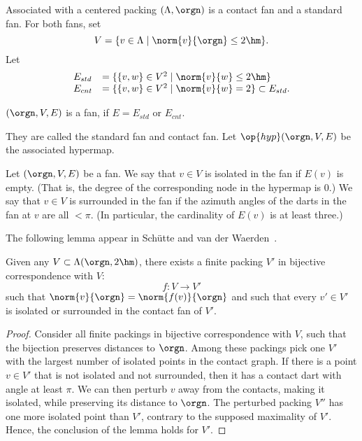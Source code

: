 Associated with a centered packing $(\Lambda,\orgn)$ is a contact fan and a standard fan.  For both fans, set
$$
V = \{v\in \Lambda\mid \norm{v}{\orgn}\le 2\hm\}.
$$
Let
\begin{equation}\label{eqn:fan-edge}
\begin{array}{lll}
 E_{std} &= \{\{v,w\}\in V^2\mid \norm{v}{w}\le 2\hm \}\\
 E_{cnt} &= \{\{v,w\}\in V^2\mid \norm{v}{w}= 2 \}\subset E_{std}.
\end{array}
\end{equation}

\begin{lemma}
$(\orgn,V,E)$ is a fan, if $E=E_{std}$ or $E_{cnt}$.
\end{lemma}
They are called the standard fan and contact fan.
Let $\op{hyp}(\orgn,V,E)$ be the associated hypermap.

\begin{definition}
Let $(\orgn,V,E)$ be a fan.
We say that $v\in V$ is isolated in the fan if $E(v)$ is empty.
(That is, the degree of the corresponding node in the hypermap is $0$.) We say that $v\in V$ is surrounded in the fan if the azimuth angles of the darts in the fan at $v$ are all $<\pi$.  (In particular, the cardinality of $E(v)$ is at least three.)
\end{definition}

The following lemma appear in Sch\"utte and van der Waerden~\cite{vanderWaerden:1951}.

\begin{lemma}
Given any $V\subset \Lambda(\orgn,2\hm)$,
there exists a finite packing $V'$ 
in bijective correspondence with $V$:
$$
f:V\to V'
$$
such that $\norm{v}{\orgn} = \norm{f(v)}{\orgn}$ and
such that every $v'\in V'$
is isolated or surrounded in the contact fan of $V'$.
\end{lemma}

\begin{proof} Consider all finite packings in 
bijective correspondence with $V$, such that the
bijection preserves distances to $\orgn$.
Among these packings pick one $V'$ with the largest number
of isolated points in the contact graph.  If there is a point $v\in V'$ that
is not isolated and not surrounded, then it has a contact
dart with angle at least $\pi$.  We can then perturb $v$ away from the contacts, making it isolated, while preserving its distance to $\orgn$.  The perturbed packing $V''$ has one more isolated point than $V'$, contrary to the supposed maximality of $V'$.  Hence, the conclusion of the 
lemma holds for $V'$.
\end{proof}

